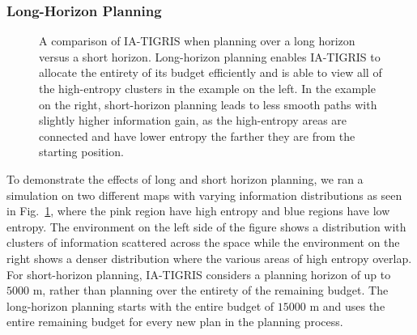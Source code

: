 





\subsubsection{Long-Horizon Planning}

\begin{figure}[t]
\centering
\caption{A comparison of IA-TIGRIS when planning over a long horizon versus a short horizon. Long-horizon planning enables IA-TIGRIS to allocate the entirety of its budget efficiently and is able to view all of the high-entropy clusters in the example on the left. In the example on the right, short-horizon planning leads to less smooth paths with slightly higher information gain, as the high-entropy areas are connected and have lower entropy the farther they are from the starting position. }
\label{fig:horizon-analysis}
\end{figure}

To demonstrate the effects of long and short horizon planning, we ran a simulation on two different maps with varying information distributions as seen in Fig.~\ref{fig:horizon-analysis}, where the pink region have high entropy and blue regions have low entropy. The environment on the left side of the figure shows a distribution with clusters of information scattered across the space while the environment on the right shows a denser distribution where the various areas of high entropy overlap. 
For short-horizon planning, IA-TIGRIS considers a planning horizon of up to $5000$ m, rather than planning over the entirety of the remaining budget. The long-horizon planning starts with the entire budget of 
$15000$ m and uses the entire remaining budget for every new plan in the planning process.

